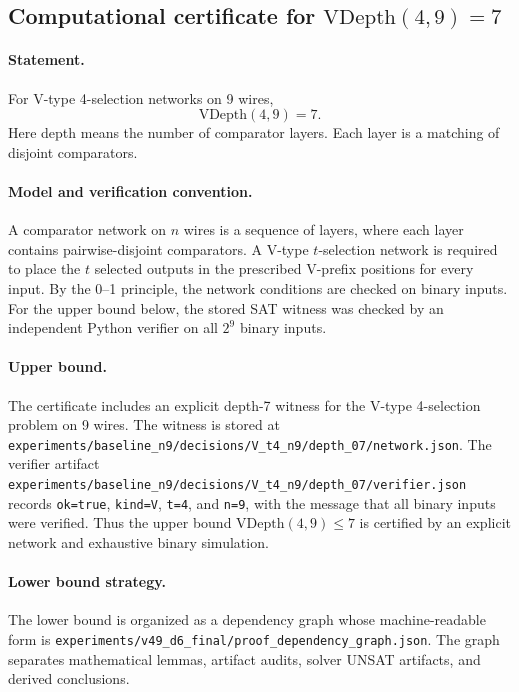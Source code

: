 \subsection{Computational certificate for $\mathrm{VDepth}(4,9)=7$}

\paragraph{Statement.}
For V-type 4-selection networks on 9 wires,
\[
  \mathrm{VDepth}(4,9)=7 .
\]
Here depth means the number of comparator layers. Each layer is a matching of
disjoint comparators.

\paragraph{Model and verification convention.}
A comparator network on \(n\) wires is a sequence of layers, where each layer
contains pairwise-disjoint comparators. A V-type \(t\)-selection network is
required to place the \(t\) selected outputs in the prescribed V-prefix
positions for every input. By the 0--1 principle, the network conditions are
checked on binary inputs. For the upper bound below, the stored SAT witness was
checked by an independent Python verifier on all \(2^9\) binary inputs.

\paragraph{Upper bound.}
The certificate includes an explicit depth-7 witness for the V-type
4-selection problem on 9 wires. The witness is stored at
\texttt{experiments/baseline\_n9/decisions/V\_t4\_n9/depth\_07/network.json}.
The verifier artifact
\texttt{experiments/baseline\_n9/decisions/V\_t4\_n9/depth\_07/verifier.json}
records \texttt{ok=true}, \texttt{kind=V}, \texttt{t=4}, and \texttt{n=9},
with the message that all binary inputs were verified. Thus the upper bound
\(\mathrm{VDepth}(4,9) \le 7\) is certified by an explicit network and
exhaustive binary simulation.

\paragraph{Lower bound strategy.}
The lower bound is organized as a dependency graph whose machine-readable form
is \texttt{experiments/v49\_d6\_final/proof\_dependency\_graph.json}. The graph
separates mathematical lemmas, artifact audits, solver UNSAT artifacts, and
derived conclusions.

